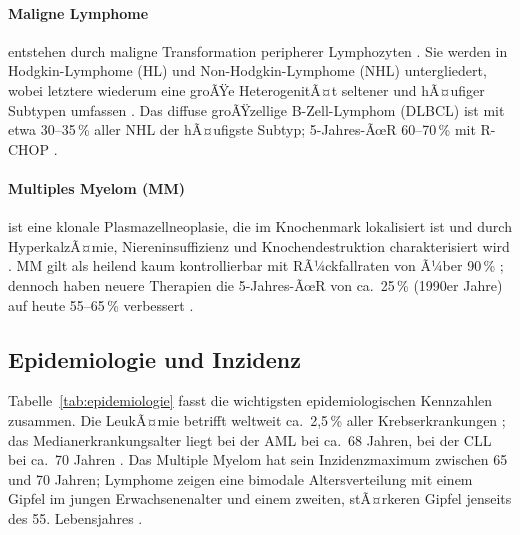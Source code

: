 ﻿\documentclass[12pt,a4paper]{article}
\theoremstyle{definition}
\begin{document}
\paragraph{Maligne Lymphome} entstehen durch maligne Transformation peripherer
Lymphozyten \cite{adeyemi2025}. Sie werden in Hodgkin-Lymphome (HL) und
Non-Hodgkin-Lymphome (NHL) untergliedert, wobei letztere wiederum eine groÃŸe
HeterogenitÃ¤t seltener und hÃ¤ufiger Subtypen umfassen \cite{swerdlow2016}. Das diffuse
groÃŸzellige B-Zell-Lymphom (DLBCL) ist mit etwa 30--35\,\% aller NHL der hÃ¤ufigste
Subtyp; 5-Jahres-ÃœR 60--70\,\% mit R-CHOP \cite{coiffier2002}.

\paragraph{Multiples Myelom (MM)} ist eine klonale Plasmazellneoplasie, die im
Knochenmark lokalisiert ist und durch HyperkalzÃ¤mie, Niereninsuffizienz und
Knochendestruktion charakterisiert wird \cite{palumbo2011}. MM gilt als heilend
kaum kontrollierbar mit RÃ¼ckfallraten von Ã¼ber 90\,\% \cite{adeyemi2025}; dennoch
haben neuere Therapien die 5-Jahres-ÃœR von ca.\ 25\,\% (1990er Jahre) auf heute
55--65\,\% verbessert \cite{kumar2017}.

\subsection{Epidemiologie und Inzidenz}

Tabelle~\ref{tab:epidemiologie} fasst die wichtigsten epidemiologischen Kennzahlen
zusammen. Die LeukÃ¤mie betrifft weltweit ca.\ 2,5\,\% aller Krebserkrankungen
\cite{adeyemi2025}; das Medianerkrankungsalter liegt bei der AML bei ca.\ 68 Jahren,
bei der CLL bei ca.\ 70 Jahren \cite{deschler2006}. Das Multiple Myelom hat sein
Inzidenzmaximum zwischen 65 und 70 Jahren; Lymphome zeigen eine bimodale
Altersverteilung mit einem Gipfel im jungen Erwachsenenalter und einem zweiten,
stÃ¤rkeren Gipfel jenseits des 55. Lebensjahres \cite{bray2018}.
\end{document}
